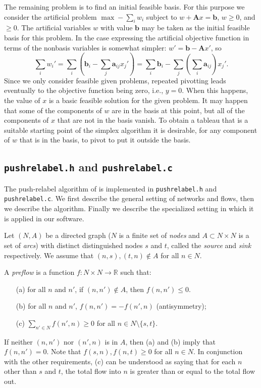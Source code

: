 \documentclass[12pt]{article}
\theoremstyle{definition}
\renewcommand{\Re}{\mathbb{R}}
\newcommand{\ba}{\mathbf{a}}
\newcommand{\bb}{\mathbf{b}}
\newcommand{\bA}{\mathbf{A}}
\begin{document}
\begin{appendix}
The remaining problem is to find an initial feasible basis.  For this
purpose we consider the artificial problem $\max - \sum_i w_i$ subject
to $w + \bA x = \bb$, $w \ge 0$, and $ \ge 0$.  The artificial
variables $w$ with value $\bb$ may be taken as the initial feasible
basis for this problem.  In the case expressing the artificial
objective function in terms of the nonbasis variables is somewhat
simpler: $w' = \bb - \bA x'$, so $$\sum_i w_i' = \sum_i (\bb_i -
\sum_j \ba_{ij} x_j') = \sum_i \bb_i - \sum_j (\sum_i \ba_{ij})x_j'.$$
Since we only consider feasible given problems, repeated pivotting
leads eventually to the objective function being zero, i.e., $y = 0$.
When this happens, the value of $x$ is a basic feasible solution for
the given problem.  It may happen that some of the components of $w$
are in the basis at this point, but all of the components of $x$ that
are not in the basis vanish.  To obtain a tableau that is a suitable
starting point of the simplex algorithm it is desirable, for any
component of $w$ that is in the basis, to pivot to put it outside the
basis.

\subsection{\texttt{pushrelabel.h} and \texttt{pushrelabel.c}}
\label{subsec:PushRelabel}

The push-relabel algorithm of \cite{GoTa88} is implemented in
\texttt{pushrelabel.h} and \texttt{pushrelabel.c}.  We first describe
the general setting of networks and flows, then we describe the
algorithm.  Finally we describe the specialized setting in which it is
applied in our software.

Let $(N,A)$ be a directed graph ($N$ is a finite set of \emph{nodes}
and $A \subset N \times N$ is a set of \emph{arcs}) with distinct
distinguished nodes $s$ and $t$, called the \emph{source} and
\emph{sink} respectively.  We assume that $(n,s), (t, n) \notin A$ for
all $n \in N$.

A \emph{preflow} is a function $f \colon N \times N \to \Re$ such that:
\begin{enumerate}
  \item[(a)] for all $n$ and $n'$,  if $(n,n') \notin A$, then $f(n,n') \le 0$.
  \item[(b)] for all $n$ and $n'$,  $f(n,n') = - f(n',n)$ (antisymmetry); 
  \item[(c)] $\sum_{n' \in N} f(n',n) \ge 0$ for all $n \in N \setminus \{s,t\}$. 
\end{enumerate}
If neither $(n,n')$ nor $(n',n)$ is in $A$, then (a) and (b) imply
that $f(n,n') = 0$.  Note that $f(s,n), f(n,t) \ge 0$ for all $n \in
N$.  In conjunction with the other requirements, (c) can be understood
as saying that for each $n$ other than $s$ and $t$, the total flow
into $n$ is greater than or equal to the total flow out.


\end{appendix}
\end{document}
